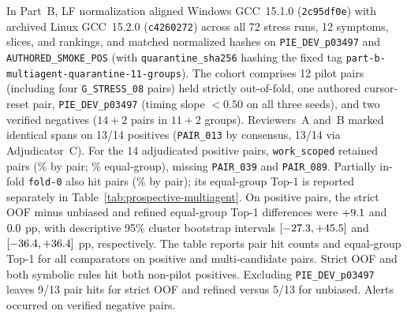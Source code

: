 In Part~B, LF normalization aligned Windows GCC~15.1.0 (\texttt{2c95df0e}) with archived Linux GCC~15.2.0 (\texttt{c4260272}) across all 72 stress runs, 12 symptoms, slices, and rankings, and matched normalized hashes on \texttt{PIE\_DEV\_p03497} and \texttt{AUTHORED\_SMOKE\_POS} (with \nolinkurl{quarantine_sha256} hashing the fixed tag \nolinkurl{part-b-multiagent-quarantine-11-groups}). The cohort comprises 12 pilot pairs (including four \texttt{G\_STRESS\_08} pairs) held strictly out-of-fold, one authored cursor-reset pair, \texttt{PIE\_DEV\_p03497} (timing slope $<0.50$ on all three seeds), and two verified negatives ($14+2$ pairs in $11+2$ groups). Reviewers~A and~B marked identical spans on 13/14 positives (\texttt{PAIR\_013} by consensus, 13/14 via Adjudicator~C). For the 14 adjudicated positive pairs, \texttt{work\_scoped} retained \GroupedPartBPositiveRetention{} pairs (\GroupedPartBRetentionPairPercent\% by pair; \GroupedPartBRetentionGroupPercent\% equal-group), missing \texttt{PAIR\_039} and \texttt{PAIR\_089}. Partially in-fold \texttt{fold-0} also hit \GroupedPartBFoldHits{} pairs (\GroupedPartBFoldPairPercent\% by pair); its equal-group Top-1 is reported separately in Table~\ref{tab:prospective-multiagent}. On positive pairs, the strict OOF minus unbiased and refined equal-group Top-1 differences were $+9.1$ and $0.0$ pp, with descriptive 95\% cluster bootstrap intervals $[-27.3, +45.5]$ and $[-36.4, +36.4]$ pp, respectively. The table reports pair hit counts and equal-group Top-1 for all comparators on positive and multi-candidate pairs. Strict OOF and both symbolic rules hit both non-pilot positives. Excluding \texttt{PIE\_DEV\_p03497} leaves 9/13 pair hits for strict OOF and refined versus 5/13 for unbiased. Alerts occurred on \GroupedPartBNegativeAlerts{} verified negative pairs.

